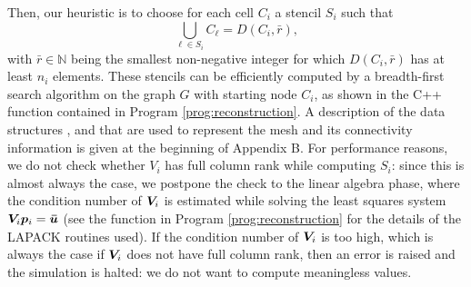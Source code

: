 Then, our heuristic is to choose for each cell $C_{i}$ a stencil $S_{i}$ such that
\begin{equation*}
\bigcup_{\ell \in S_{i}} C_{\ell}=D(C_{i},\bar{r}),
\end{equation*}
with $\bar{r}\in\mathbb{N}$ being the smallest non-negative integer for
which $D(C_{i},\bar{r})$ has at least $n_{i}$ elements.
These stencils can be efficiently computed by a breadth-first search algorithm on
the graph $G$ with starting node $C_{i}$, as shown in the C++ function
 contained in Program \ref{prog:reconstruction}.
A description of the data structures ,  and
 that are used to represent the mesh and its connectivity
information is given at the beginning of Appendix B.
For performance reasons, we do not check whether $V_{i}$ has
full column rank while computing $S_{i}$: since this is almost always the case,
we postpone the check to the linear algebra phase, where the condition number
of $\bm{V}_{i}$ is estimated while solving the least squares system
$\bm{V}_{i} \bm{p}_{i}=\bm{\bar{u}}$ (see the function
 in Program
\ref{prog:reconstruction} for the details of the LAPACK routines used).
If the condition number of $\bm{V}_{i}$
is too high, which is always the case if $\bm{V}_{i}$ does not have full column
rank, then an error is raised and the simulation is halted: we do not want
to compute meaningless values.

